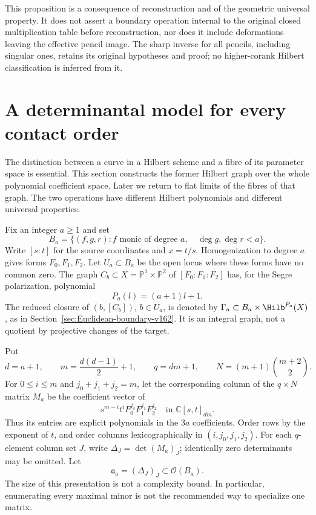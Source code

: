 \documentclass[11pt,reqno]{amsart}
\numberwithin{equation}{section}
\theoremstyle{definition}\newtheorem{definition}[theorem]{Definition}
\theoremstyle{remark}\newtheorem{remark}[theorem]{Remark}
\newcommand{\C}{\mathbb C}\newcommand{\Q}{\mathbb Q}
\newcommand{\Pj}{\mathbb P}\newcommand{\A}{\mathbb A}
\newcommand{\OO}{\mathcal O}\newcommand{\II}{\mathcal I}
\begin{document}
This proposition is a consequence of reconstruction and of the
geometric universal property. It does not assert a boundary
operation internal to the original closed multiplication table
before reconstruction, nor does it include deformations leaving
the effective pencil image. The sharp inverse for all pencils,
including singular ones, retains its original hypotheses and proof;
no higher-corank Hilbert classification is inferred from it.

\section{A determinantal model for every contact order}
\label{sec:determinantal-v167}
The distinction between a curve in a Hilbert scheme and a fibre of
its parameter space is essential. This section constructs the former
Hilbert graph over the whole polynomial coefficient space. Later we
return to flat limits of the fibres of that graph. The two operations
have different Hilbert polynomials and different universal properties.

Fix an integer $a\geq1$ and set
\[
 B_a=\{(f,g,r):f\text{ monic of degree }a,\quad
                         \deg g,\deg r<a\}.
\]
Write $[s:t]$ for the source coordinates and $x=t/s$. Homogenization
to degree $a$ gives forms $F_0,F_1,F_2$. Let $U_a\subset B_a$ be
the open locus where these forms have no common zero. The graph
$C_b\subset X=\Pj^1\times\Pj^2$ of $[F_0:F_1:F_2]$ has, for the
Segre polarization, polynomial
\[
 P_a(l)=(a+1)l+1.
\]
The reduced closure of $(b,[C_b])$, $b\in U_a$, is denoted by
$\Gamma_a\subset B_a\times\Hilb^{P_a}(X)$, as in
Section~\ref{sec:Euclidean-boundary-v162}. It is an integral graph,
not a quotient by projective changes of the target.

Put
\begin{equation}\label{eq:hilbert-degree-v167}
 d=a+1,\qquad m=\frac{d(d-1)}2+1,\qquad
 q=dm+1,\qquad N=(m+1)\binom{m+2}{2}.
\end{equation}
For $0\leq i\leq m$ and $j_0+j_1+j_2=m$, let the corresponding
column of the $q\times N$ matrix $M_a$ be the coefficient vector of
\begin{equation}\label{eq:state-matrix-v167}
 s^{m-i}t^i F_0^{j_0}F_1^{j_1}F_2^{j_2}
                   \quad\text{in }\C[s,t]_{dm}.
\end{equation}
Thus its entries are explicit polynomials in the $3a$ coefficients.
Order rows by the exponent of $t$, and order columns
lexicographically in $(i,j_0,j_1,j_2)$. For each $q$-element column
set $J$, write $\Delta_J=\det(M_a)_J$; identically zero determinants
may be omitted. Let
\begin{equation}\label{eq:hilbert-ideal-v167}
                         \mathfrak a_a=(\Delta_J)_J\subset\OO(B_a).
\end{equation}
The size of this presentation is not a complexity bound. In
particular, enumerating every maximal minor is not the recommended
way to specialize one matrix.
\end{document}
